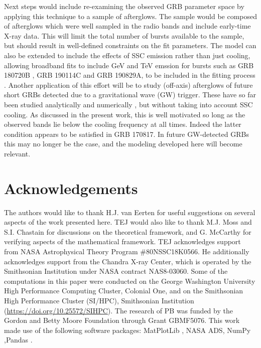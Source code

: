 \documentclass[fleqn,usenatbib]{mnras}
\begin{document}
Next steps would include re-examining the observed GRB parameter space by applying this technique to a sample of afterglows. The sample would be composed of afterglows which were well sampled in the radio bands and include early-time X-ray data. This will limit the total number of bursts available to the sample, but should result in well-defined constraints on the fit parameters. The model can also be extended to include the effects of SSC emission rather than just cooling, allowing broadband fits to include GeV and TeV emssion for bursts such as GRB 180720B \citep{HESS}, GRB 190114C \citep{MAGIC} and GRB 190829A, to be included in the fitting process \citep[e.g.][]{derishev,fraija,wang}. 
Another application of this effort will be to study (off-axis) afterglows of future short GRBs detected due to a gravitational wave (GW) trigger. These have so far been studied analytically \citep[e.g.][]{WuGW, FongGW,FraijaGW,BGG20} and numerically \citep[e.g.][]{WuGW2,GottliebGW,GillGW,LBM20}, but without taking into account SSC cooling. As discussed in the present work, this is well motivated so long as the observed bands lie below the cooling frequency at all times. Indeed the latter condition appears to be satisfied in GRB 170817. In future GW-detected GRBs this may no longer be the case, and the modeling developed here will become relevant.


\section*{Acknowledgements}
The authors would like to thank H.J. van Eerten for useful suggestions on several aspects of the work presented here. TEJ would also like to thank M.J. Moss and S.I. Chastain for discussions on the theoretical framework, and G. McCarthy for verifying aspects of the mathematical framework. TEJ acknowledges support from NASA Astrophysical Theory Program \#80NSSC18K0566. He additionally acknowledges support from the Chandra X-ray Center, which is operated by the Smithsonian Institution under NASA contract NAS8-03060. Some of the computations in this paper were conducted on the George Washington University High Performance Computing Cluster, Colonial One, and on the Smithsonian High Performance Cluster (SI/HPC), Smithsonian Institution (\url{https://doi.org/10.25572/SIHPC}). The research of PB was funded by the Gordon and Betty Moore Foundation through Grant GBMF5076.
This work made use of the following software packages: MatPlotLib \citep{Hunter:2007}, NASA ADS, NumPy \citep{van2011numpy},Pandas \citep{pandas}.
\end{document}
